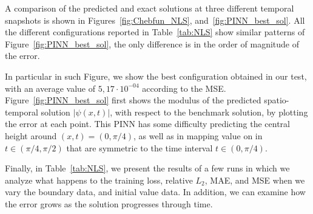 \documentclass[pdflatex,sn-basic]{sn-jnl}%
\theoremstyle{thmstyleone}%
\theoremstyle{thmstyletwo}%
\theoremstyle{thmstylethree}%
\begin{document}
A comparison of the predicted and exact solutions at three different temporal snapshots is shown in Figures~\ref{fig:Chebfun_NLS}, and~\ref{fig:PINN_best_sol}.
All the different configurations reported in Table~\ref{tab:NLS} show similar patterns of Figure~\ref{fig:PINN_best_sol}, the only difference is in the order of magnitude of the error. 

In particular in such Figure, we show the best configuration obtained in our test, with an average value of
$5,17\cdot 10^{-04}$ %
according to the MSE.
Figure~\ref{fig:PINN_best_sol} first shows the modulus of the predicted spatio-temporal solution $\lvert  \psi(x,t)\rvert$, with respect to the benchmark solution, by plotting the error at each point.
This PINN has some difficulty predicting the central height around $(x,t)=(0,\pi/4)$, as well as in mapping value on in  $t \in (\pi/4, \pi/2)$ that are symmetric to the time interval $t \in (0, \pi/4)$.



Finally, in Table~\ref{tab:NLS}, we present the results of a few runs in which we analyze what happens to the training loss, relative $L_2$, MAE, and MSE when we vary the boundary data, and initial value data.
%
In addition, we can examine how the error grows as the solution progresses through time. 
\end{document}
